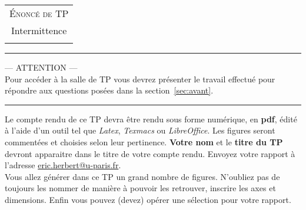 \documentclass[12pt,a4,french]{article}
\begin{document}
	
	
	
	\chead{}
	
	
	\begin{center}
		\begin{tabular}{c}
			{\Large  \textsc{Énoncé de TP}}\\
			{\Large{Intermittence}}\\
			\\
		\end{tabular}
		
		\normalsize 
		
		\hrule
		\vspace{0.5cm}
		
		--- ATTENTION ---\\
		Pour accéder à la salle de TP vous devrez présenter le travail effectué pour répondre aux questions posées dans la section~\ref{sec:avant}.
		
		\vspace{0.5cm}
		\hrule
	\end{center}



Le compte rendu de ce TP devra être rendu sous forme numérique, en \textbf{pdf},
édité à l'aide d'un outil tel que \textit{Latex}, \textit{Texmacs} ou \textit{LibreOffice}. Les figures seront
commentées et choisies selon leur pertinence.
\textbf{Votre nom} et le \textbf{titre du TP}  devront apparaitre dans le titre de votre compte rendu.
Envoyez votre rapport à l'adresse  \href{mailto:eric.herbert@u-paris.fr}{eric.herbert@u-paris.fr}. \\
Vous allez générer dans ce TP un grand nombre de figures. N'oubliez pas de toujours les nommer de manière à pouvoir les retrouver, inscrire les axes et dimensions. Enfin vous pouvez (devez) opérer une sélection pour votre rapport.
\end{document}
